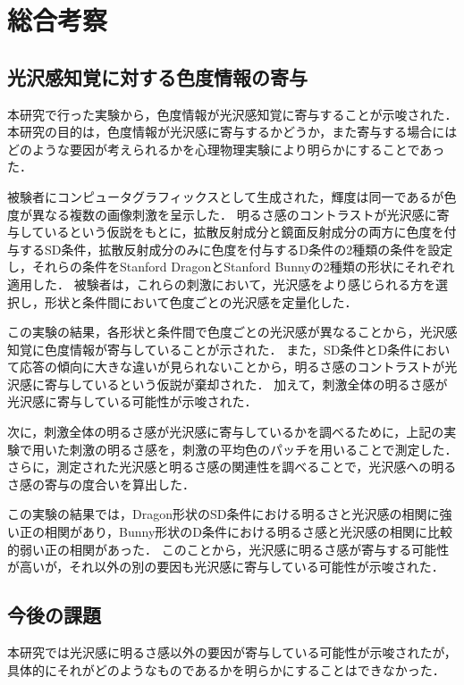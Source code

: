 \chapter{総合考察}
    \section{光沢感知覚に対する色度情報の寄与}
        本研究で行った実験から，色度情報が光沢感知覚に寄与することが示唆された．
        本研究の目的は，色度情報が光沢感に寄与するかどうか，また寄与する場合にはどのような要因が考えられるかを心理物理実験により明らかにすることであった．

        被験者にコンピュータグラフィックスとして生成された，輝度は同一であるが色度が異なる複数の画像刺激を呈示した．
        明るさ感のコントラストが光沢感に寄与しているという仮説をもとに，拡散反射成分と鏡面反射成分の両方に色度を付与するSD条件，拡散反射成分のみに色度を付与するD条件の2種類の条件を設定し，それらの条件をStanford DragonとStanford Bunnyの2種類の形状にそれぞれ適用した．
        被験者は，これらの刺激において，光沢感をより感じられる方を選択し，形状と条件間において色度ごとの光沢感を定量化した．

        この実験の結果，各形状と条件間で色度ごとの光沢感が異なることから，光沢感知覚に色度情報が寄与していることが示された．
        また，SD条件とD条件において応答の傾向に大きな違いが見られないことから，明るさ感のコントラストが光沢感に寄与しているという仮説が棄却された．
        加えて，刺激全体の明るさ感が光沢感に寄与している可能性が示唆された．

        次に，刺激全体の明るさ感が光沢感に寄与しているかを調べるために，上記の実験で用いた刺激の明るさ感を，刺激の平均色のパッチを用いることで測定した．
        さらに，測定された光沢感と明るさ感の関連性を調べることで，光沢感への明るさ感の寄与の度合いを算出した．

        この実験の結果では，Dragon形状のSD条件における明るさと光沢感の相関に強い正の相関があり，Bunny形状のD条件における明るさ感と光沢感の相関に比較的弱い正の相関があった．
        このことから，光沢感に明るさ感が寄与する可能性が高いが，それ以外の別の要因も光沢感に寄与している可能性が示唆された．


    \section{今後の課題}
        本研究では光沢感に明るさ感以外の要因が寄与している可能性が示唆されたが，具体的にそれがどのようなものであるかを明らかにすることはできなかった．


    \newpage